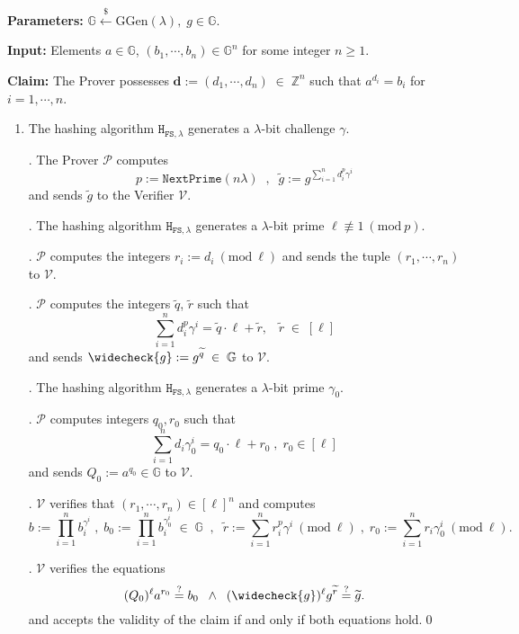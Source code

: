 \documentclass[11pt, lettersize, notitlepage, leqno, footskip=0.6cm]{article}
\newcommand{\bz}{\mathbb Z}
\newcommand{\pl}{\prod\limits}
\newcommand{\slim}{\sum\limits}
\newcommand{\ttt}{\texttt}
\newcommand{\bG}{\mathbb{G}}
\newcommand{\wti}{\widetilde}
\newcommand{\mc}{\mathcal}
\newcommand{\mb}{\mathbb}
\newcommand{\mbf}{\mathbf}
\newcommand{\mr}{\mathrm}
\newcommand{\lam}{\lambda}
\newcommand{\lamb}{\lambda}
\newcommand{\weck}{\widecheck}
\newcommand{\mP}{\mc{P}}
\newcommand{\V}{\mc{V}}
\newcommand{\vs}{\vspace{-0.15cm}}
\newcommand{\noin}{\noindent}
\newcommand{\sta}{\stackrel{?}{=}}
\newcommand{\Mod}[1]{\ (\mathrm{mod}\ #1)}
\newtheorem{Prot}[Thm]{Protocol}
\numberwithin{equation}{section}
\begin{document}
 \vspace{-0.3cm}

\noindent \textbf{Parameters:} $\mb{G}\xleftarrow{\$} \mr{GGen}(\lamb), \; g\in \mb{G}$.

\noindent \textbf{Input:} Elements $a\in\mb{G} $, $(b_1,\cdots,b_n)\in \mb{G}^n$ for some integer $n\geq 1$.

\noindent \textbf{Claim:} The Prover possesses $\mbf{d}:= (d_1,\cdots, d_n)\;\in\;\bz^n$ such that $a^{d_i} = b_i$ for $i = 1,\cdots, n$.

\begin{enumerate}[wide, labelwidth=!, labelindent=0pt]\vs \item \normalfont The hashing algorithm ${\ttt{H}}_{{\ttt{FS}},\lam}$ generates a $\lam$-bit challenge $\gamma$.

\noin 2. The Prover $\mc{P}$ computes \vspace{-0.25cm} $$p:= \ttt{NextPrime}(n\lam)\;\;,\;\;\wti{g} := g^{\sum\limits_{i=1}^n d_i^{p}\gamma^i}$$ and sends $\wti{g}$ to the Verifier $\mc{V}$.


\noin 3. The hashing algorithm $\ttt{H}_{\ttt{FS},\lam}$ generates a $\lam$-bit prime $\ell\not\equiv 1\Mod{p}$. 

\noin 4. $\mc{P}$ computes the integers $r_i:= d_i\Mod{\ell}$ and sends the tuple $(r_1,\cdots,r_n)$ to $\V$.

\noin 5. $\mP$ computes the integers $\wti{q}$, $\wti{r}$ such that \vs $$\slim_{i=1}^n d_i^{p}\gamma^i = \wti{q} \cdot \ell+\wti{r},\;\;\;\wti{r}\;\in\;[\ell]$$ and sends $\weck{g}:= g^{\wti{q}}\;\in\;\bG$ to $\V$.

\noin 6. The hashing algorithm $\ttt{H}_{\ttt{FS},\lam}$ generates a $\lam$-bit prime $\gamma_{0}$.

\noin 7. $\mP$ computes integers $q_0, r_0$ such that \vs $$\slim_{i=1}^n d_i\gamma_{0}^i = q_0 \cdot \ell+r_0\;,\;r_0\in[\ell] $$ and sends $Q_0:= a^{q_0}\in \bG$ to $\V.$

\noin 8. $\mc{V}$ verifies that $(r_1,\cdots,r_n)\in [\ell]^n$ and computes \vs $$b := \pl_{i=1}^n b_i^{\gamma^i}\;,\;b_0 := \pl_{i=1}^n b_i^{\gamma_{0}^i}\;\in \;\bG\;\;,\;\;\wti{r}:= \slim_{i=1}^n r_i^{p}\gamma^i\Mod{\ell}\;,\;r_0:=\slim_{i=1}^n r_i\gamma_{0}^i\Mod{\ell}.$$ 

\noin 9. $\V$ verifies the equations \vs $$(Q_0)^{\ell}a^{r_0}\sta b_0\;\;\wedge\;\; (\weck{g})^{\ell}g^{\wti{r}}\sta\wti{g}.$$ and accepts the validity of the claim if and only if both equations hold.\qed  \end{enumerate}
\end{document}

